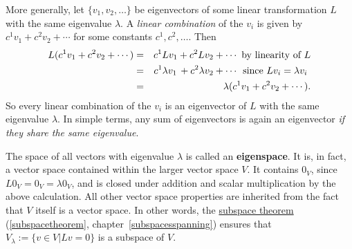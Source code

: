 More generally, let $\{ v_1, v_2, \ldots \}$ be eigenvectors of some linear transformation $L$ with the same eigenvalue $\lambda$.  A \emph{linear combination} of the $v_i$ is given by $c^1v_1+c^2v_2+\cdots$ for some constants $c^1, c^2,\ldots$.  Then
\begin{eqnarray*}
L(c^1v_1+c^2v_2+\cdots) &=& c^1Lv_1+c^2Lv_2+\cdots \text{ by linearity of $L$}\\
&=& c^1\lambda v_1\,+c^2\lambda v_2+\cdots \hspace{.5mm} \text{ since $Lv_i=\lambda v_i$ }\\
&=& \lambda (c^1v_1+c^2v_2+\cdots).
\end{eqnarray*}
So every linear combination of the $v_i$ is an eigenvector of $L$ with the same eigenvalue $\lambda$.
In simple terms, any sum of eigenvectors is again an eigenvector {\it if they share the same eigenvalue}.

The space of all vectors with eigenvalue $\lambda$ is called an {\bf eigenspace}.  It is, in fact, a vector space contained within the larger vector space $V$.  It contains $0_V$, since $L0_V=0_V=\lambda 0_V$, and is closed under addition and scalar multiplication by the above calculation.  All other vector space properties are inherited from the fact that $V$ itself is a vector space. In other words, the \hyperlink{sst}{subspace theorem} (\ref{subspacetheorem}, chapter~\ref{subspacesspanning}) ensures that $V_\lambda:=\{v\in V|Lv=0\}$ is a subspace of $V$.




